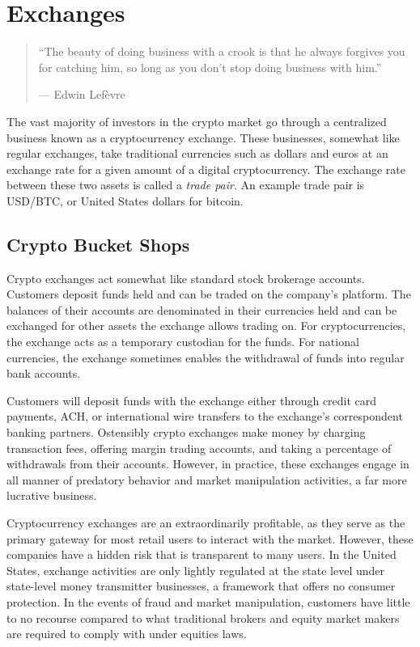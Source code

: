 \chapter{Exchanges}

\begin{quote}
``The beauty of doing business with a crook is that he always forgives you for
  catching him, so long as you don't stop doing business with him.''
\begin{flushright}
--- Edwin Lefèvre
\end{flushright}
\end{quote}

The vast majority of investors in the crypto market go through a centralized
business known as a cryptocurrency exchange. These businesses, somewhat like
regular exchanges, take traditional currencies such as dollars and euros at an
exchange rate for a given amount of a digital cryptocurrency. The exchange rate
between these two assets is called a \textit{trade pair}. An example trade pair
is USD/BTC, or United States dollars for bitcoin.

\section{Crypto Bucket Shops}


Crypto exchanges act somewhat like standard stock brokerage accounts. Customers
deposit funds held and can be traded on the company's platform. The balances of
their accounts are denominated in their currencies held and can be exchanged for
other assets the exchange allows trading on. For cryptocurrencies, the exchange
acts as a temporary custodian for the funds. For national currencies, the
exchange sometimes enables the withdrawal of funds into regular bank accounts.

Customers will deposit funds with the exchange either through credit card
payments, ACH, or international wire transfers to the exchange's correspondent
banking partners. Ostensibly crypto exchanges make money by charging transaction
fees, offering margin trading accounts, and taking a percentage of withdrawals
from their accounts. However, in practice, these exchanges engage in all manner
of predatory behavior and market manipulation activities, a far more lucrative
business.

Cryptocurrency exchanges are an extraordinarily profitable, as they serve as the
primary gateway for most retail users to interact with the market. However,
these companies have a hidden risk that is transparent to many users. In the
United States, exchange activities are only lightly regulated at the state level
under state-level money transmitter businesses, a framework that offers no
consumer protection. In the events of fraud and market manipulation, customers
have little to no recourse compared to what traditional brokers and equity
market makers are required to comply with under equities laws.

